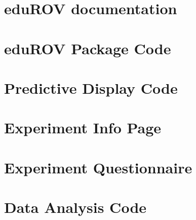 \documentclass[b5paper,10pt,twoside,openright]{book}
\begin{document}
{\begin{appendices}
\chapter*{eduROV documentation}\label{appDoc}







\chapter*{eduROV Package Code}\label{appCode}


\chapter*{Predictive Display Code}\label{appPredict}


\chapter*{Experiment Info Page}\label{appInfo}


\chapter*{Experiment Questionnaire}\label{appSurvey}


\chapter*{Data Analysis Code}\label{appAnalysis}



\end{appendices}}
\end{document}
